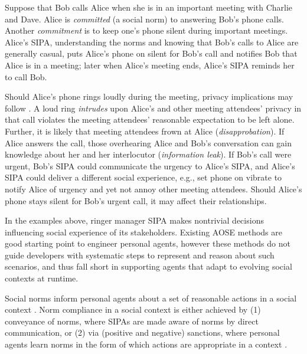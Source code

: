 Suppose that Bob calls Alice when she is in an important meeting with
Charlie and Dave. Alice is \emph{committed} (a social norm)
to answering Bob's phone calls. Another \emph{commitment} is to keep
one's phone silent during important meetings. Alice's SIPA,
understanding the norms and knowing that Bob's calls to Alice are
generally casual, puts Alice's phone on silent for Bob's call and
notifies Bob that Alice is in a meeting; later when Alice's meeting
ends, Alice's SIPA reminds her to call Bob.

Should Alice's phone rings loudly during the meeting, privacy
implications may follow
\citep{Murukannaiah-IC16-Engineering,solove-2006-taxonomy}. A loud ring
\emph{intrudes} upon Alice's and other meeting attendees' privacy in
that call violates the meeting attendees' reasonable expectation to be
left alone. Further, it is likely that meeting attendees frown at Alice
(\emph{disapprobation}). If Alice answers the call, those overhearing
Alice and Bob's conversation can gain knowledge about her and her
interlocutor (\emph{information leak}). If Bob's call were urgent, Bob's
SIPA could communicate the urgency to Alice's SIPA, and Alice's SIPA
could deliver a different social experience, e.g., set phone on vibrate
to notify Alice of urgency and yet not annoy other meeting attendees.
Should Alice's phone stays silent for Bob's urgent call, it may affect
their relationships.

In the examples above, ringer manager SIPA makes nontrivial decisions
influencing social experience of its stakeholders. Existing AOSE methods
\citep{Bresciani-JAAMAS04-Tropos,Winikoff-2004-DIA,Murukannaiah-AAMAS14-Xipho}
are good starting point to engineer personal agents, however these
methods do not guide developers with systematic steps to represent and
reason about such scenarios, and thus fall short in supporting agents
that adapt to evolving social contexts at runtime.

Social norms inform personal agents about a set of reasonable actions in a social
context \citep{vanRiemsdijk-AAMAS15-SociallyAdaptive}. Norm compliance in
a social context is either achieved by (1) conveyance of norms, where
SIPAs are made aware of norms by direct communication, or (2) via
(positive and negative) sanctions, where personal agents learn norms in the form
of which actions are appropriate in a context
\citep{Andrighetto-2013-PunishVoice}. 

